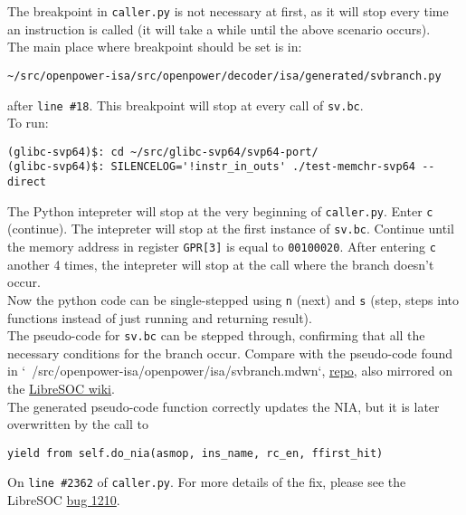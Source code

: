 The breakpoint in \texttt{caller.py} is not necessary at first, as it will
stop every time an instruction is called (it will take a while until the
above scenario occurs).\\

The main place where breakpoint should be set is in:

\begin{verbatim}
~/src/openpower-isa/src/openpower/decoder/isa/generated/svbranch.py
\end{verbatim}

after \texttt{line \#18}. This breakpoint will stop at
every call of \texttt{sv.bc}.\\

To run:
\begin{verbatim}
(glibc-svp64)$: cd ~/src/glibc-svp64/svp64-port/
(glibc-svp64)$: SILENCELOG='!instr_in_outs' ./test-memchr-svp64 --direct
\end{verbatim}

The Python intepreter will stop at the very beginning of \texttt{caller.py}.
Enter \texttt{c} (continue). The intepreter will stop at the first instance
of \texttt{sv.bc}. Continue until the memory address in register
\texttt{GPR[3]} is equal to \texttt{00100020}.
After entering \texttt{c} another 4 times, the intepreter will stop at the
call where the branch doesn't occur.\\

Now the python code can be single-stepped using \texttt{n} (next) and
\texttt{s} (step, steps into functions instead of just running
and returning result).\\

The pseudo-code for \texttt{sv.bc} can be stepped through,
confirming that all the necessary conditions for the branch occur.
Compare with the pseudo-code found in
`~/src/openpower-isa/openpower/isa/svbranch.mdwn`,
\href{https://git.libre-soc.org/?p=openpower-isa.git;a=blob;f=openpower/isa/svbranch.mdwn;h=e8b46e7700b44c6112ee2d873cc2e04b3c732370;hb=089e6d352ec57be4ab645d18ad9e95df3af0d365}{repo},
also mirrored on the
\href{https://libre-soc.org/openpower/isa/svbranch/}{LibreSOC wiki}.\\

The generated pseudo-code function correctly updates the \acrfull{NIA},
but it is later overwritten by the call to 
\begin{verbatim}
yield from self.do_nia(asmop, ins_name, rc_en, ffirst_hit)
\end{verbatim}

On \texttt{line \#2362} of \texttt{caller.py}. For more details of the fix,
please see the LibreSOC
\href{https://bugs.libre-soc.org/show_bug.cgi?id=1210}{bug 1210}.